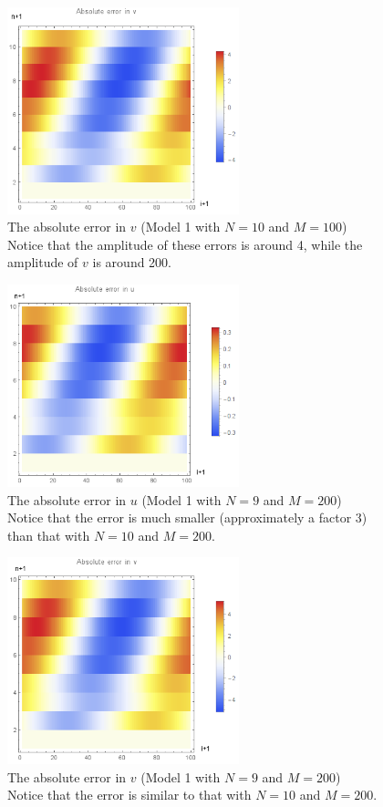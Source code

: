 \documentclass{article}
\renewcommand{\(}{\left(}
\renewcommand{\)}{\right)}
\begin{document}
\begin{figure}
\centering
\includegraphics[width=0.6\textwidth]{errorVneat.png}
\caption{The absolute error in $v$ (Model 1 with $N=10$ and $M=100$)\\Notice that the amplitude of these errors is around 4, while the amplitude of $v$ is around 200. }
\label{fig:verr1}
\end{figure}

\begin{figure}
\centering
\includegraphics[width=0.6\textwidth]{errorUneat9x100.png}
\caption{The absolute error in $u$ (Model 1 with $N=9$ and $M=200$)\\Notice that the error is much smaller (approximately a factor 3) than that with $N=10$ and $M=200$.}
\label{fig:uerr1small}
\end{figure}

\begin{figure}
\centering
\includegraphics[width=0.6\textwidth]{errorVneat9x100.png}
\caption{The absolute error in $v$ (Model 1 with $N=9$ and $M=200$)\\Notice that the error is similar to that with $N=10$ and $M=200$.}
\label{fig:verr1small}
\end{figure}
\end{document}
